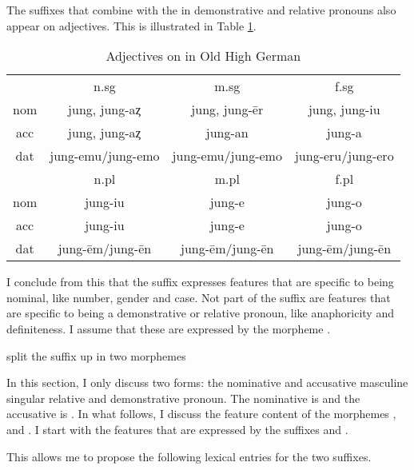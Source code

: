 The suffixes that combine with the  in demonstrative and relative pronouns also appear on adjectives. This is illustrated in Table \ref{tbl:adj-ohg}.

\begin{table}[htbp]
 \center
 \caption {Adjectives on  in Old High German }
  \begin{tabular}{cccc}
  \toprule
            & \ac{n}.\ac{sg}    & \ac{m}.\ac{sg}      & \ac{f}.\ac{sg}    \\
    \cmidrule{2-4}
  \ac{nom}  & jung, jung-aȥ     & jung, jung-ēr       & jung, jung-iu     \\
  \ac{acc}  & jung, jung-aȥ     & jung-an             & jung-a            \\
  \ac{dat}  & jung-emu/jung-emo & jung-emu/jung-emo   & jung-eru/jung-ero \\
  \bottomrule
            & \ac{n}.\ac{pl}    & \ac{m}.\ac{pl}      &  \ac{f}.\ac{pl}   \\
      \cmidrule{2-4}
  \ac{nom}  & jung-iu           &  jung-e             & jung-o            \\
  \ac{acc}  & jung-iu           &  jung-e             & jung-o            \\
  \ac{dat}  & jung-ēm/jung-ēn   &  jung-ēm/jung-ēn    & jung-ēm/jung-ēn   \\
    \bottomrule
  \end{tabular}
  \label{tbl:adj-ohg}
\end{table}

I conclude from this that the suffix expresses features that are specific to being nominal, like number, gender and case. Not part of the suffix are features that are specific to being a demonstrative or relative pronoun, like anaphoricity and definiteness. I assume that these are expressed by the morpheme .

split the suffix up in two morphemes


In this section, I only discuss two forms: the nominative and accusative masculine singular relative and demonstrative pronoun. The nominative is  and the accusative is . In what follows, I discuss the feature content of the morphemes ,  and . I start with the features that are expressed by the suffixes  and .

This allows me to propose the following lexical entries for the two suffixes.



